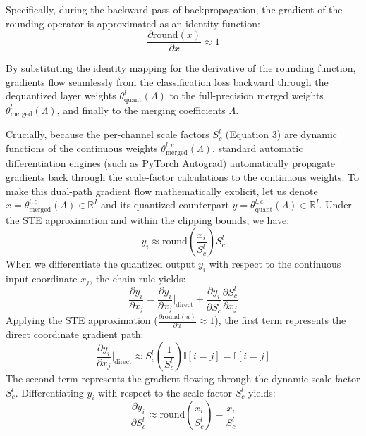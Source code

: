 Specifically, during the backward pass of backpropagation, the gradient of the rounding operator is approximated as an identity function:
\begin{equation}
    \frac{\partial \text{round}(x)}{\partial x} \approx 1
\end{equation}

By substituting the identity mapping for the derivative of the rounding function, gradients flow seamlessly from the classification loss backward through the dequantized layer weights $\theta^l_{\text{quant}}(\Lambda)$ to the full-precision merged weights $\theta^l_{\text{merged}}(\Lambda)$, and finally to the merging coefficients $\Lambda$. 

Crucially, because the per-channel scale factors $S^l_c$ (Equation 3) are dynamic functions of the continuous weights $\theta^{l,c}_{\text{merged}}(\Lambda)$, standard automatic differentiation engines (such as PyTorch Autograd) automatically propagate gradients back through the scale-factor calculations to the continuous weights. To make this dual-path gradient flow mathematically explicit, let us denote $x = \theta^{l,c}_{\text{merged}}(\Lambda) \in \mathbb{R}^I$ and its quantized counterpart $y = \theta^{l,c}_{\text{quant}}(\Lambda) \in \mathbb{R}^I$. Under the STE approximation and within the clipping bounds, we have:
\begin{equation}
    y_i \approx \text{round}\left(\frac{x_i}{S^l_c}\right) S^l_c
\end{equation}
When we differentiate the quantized output $y_i$ with respect to the continuous input coordinate $x_j$, the chain rule yields:
\begin{equation}
    \frac{\partial y_i}{\partial x_j} = \frac{\partial y_i}{\partial x_j}\bigg|_{\text{direct}} + \frac{\partial y_i}{\partial S^l_c} \frac{\partial S^l_c}{\partial x_j}
\end{equation}
Applying the STE approximation ($\frac{\partial \text{round}(u)}{\partial u} \approx 1$), the first term represents the direct coordinate gradient path:
\begin{equation}
    \frac{\partial y_i}{\partial x_j}\bigg|_{\text{direct}} \approx S^l_c \left(\frac{1}{S^l_c}\right) \mathbb{I}[i = j] = \mathbb{I}[i = j]
\end{equation}
The second term represents the gradient flowing through the dynamic scale factor $S^l_c$. Differentiating $y_i$ with respect to the scale factor $S^l_c$ yields:
\begin{equation}
    \frac{\partial y_i}{\partial S^l_c} \approx \text{round}\left(\frac{x_i}{S^l_c}\right) - \frac{x_i}{S^l_c}
\end{equation}
